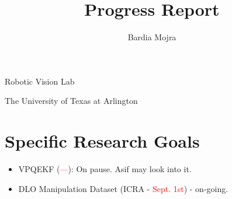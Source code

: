 \documentclass[11pt]{article}
\title{Progress Report}
\author{Bardia Mojra}
\begin{document}
\maketitle
\thispagestyle{empty}

\bigskip
\bigskip
\begin{center}
 Robotic Vision Lab
\end{center}

\begin{center}
The University of Texas at Arlington
\end{center}

\newpage

\section{Specific Research Goals}
\begin{itemize}
      \item VPQEKF (\textcolor{red}{---}): On pause. Asif may look into it.
      \item DLO Manipulation Dataset (ICRA - \textcolor{red}{Sept. 1st}) - on-going.
\end{itemize}
\end{document}
